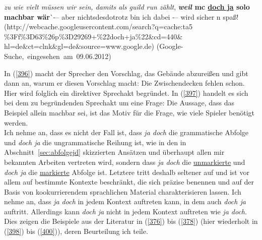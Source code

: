 \begin{exe}
	\ex\label{397}
	\scriptsize
	\emph{zu \glqq wie vielt\grqq{} müssen wir sein, damits als guild run zählt}, \textbf{\textit{weil} mc \underline{doch ja} solo machbar wär}^^ -– aber 	nichtsdesdotrotz bin ich dabei -– wird sicher n 	spaß!
	\newline
	\hbox{}\hfill\hbox{(http://webcache.googleusercontent.com/search?q=cache:ta5}	
	\newline
	\hbox{}\hfill\hbox{\%3Ff\%3D63\%26p\%3D29269+\%22doch+ja\%22\&cd=440\&}
	\newline
	\hbox{}\hfill\hbox{hl=de\&ct=clnk\&gl=de\&source=www.google.de)}
	\newline
	\hbox{}\hfill\hbox{(Google-Suche, eingesehen am 09.06.2012)}
\end{exe} 

In (\ref{396}) macht der Sprecher den Vorschlag, das Gebäude abzureißen und gibt dann an, warum er diesen Vorschlag macht: Die Zwischendecken fehlen schon. Hier wird folglich ein direktiver Sprechakt begründet. In (\ref{397}) handelt es sich bei dem zu begründenden Sprechakt um eine Frage: Die Aussage, dass das Beispiel allein machbar sei, ist das Motiv für die Frage, wie viele Spieler benötigt werden.\\

\noindent	
Ich nehme an, dass es nicht der Fall ist, dass \textit{ja doch} die grammatische Abfolge und \textit{doch ja} die ungrammatische Reihung ist, wie in den in Abschnitt~\ref{sec:abfolgejd} skizzier\-ten Ansätzen und überhaupt allen mir bekannten Arbeiten vertreten wird, sondern dass \textit{ja doch} die \underline{unmarkierte}  und \textit{doch ja} die \underline{markierte} Abfolge ist. Letztere tritt deshalb seltener auf und ist vor allem auf bestimmte Kontexte beschränkt, die sich präzise benennen und auf der Basis von kookurrierendem sprachlichen Material charakterisieren lassen. Ich nehme an, dass \textit{ja doch} in jedem Kontext auftreten kann, in dem auch \textit{doch ja} auftritt. Allerdings kann \textit{doch ja} nicht in jedem Kontext auftreten wie \textit{ja doch}. Dies zeigen die Beispiele aus der Literatur in (\ref{376}) bis (\ref{378}) (hier wiederholt in (\ref{398}) bis (\ref{400})), deren Beurteilung ich teile.

